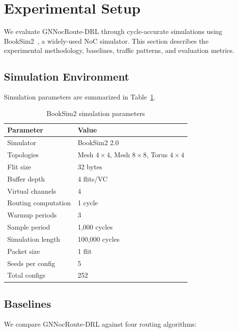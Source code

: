 \section{Experimental Setup}
\label{sec:experiments}

We evaluate GNNocRoute-DRL through cycle-accurate simulations using BookSim2~\cite{booksim}, a widely-used NoC simulator. This section describes the experimental methodology, baselines, traffic patterns, and evaluation metrics.

\subsection{Simulation Environment}

Simulation parameters are summarized in Table~\ref{tab:simparams}.

\begin{table}[h]
\centering
\caption{BookSim2 simulation parameters}
\label{tab:simparams}
\begin{tabular}{ll}
\toprule
\textbf{Parameter} & \textbf{Value} \\
\midrule
Simulator & BookSim2 2.0 \\
Topologies & Mesh $4\times4$, Mesh $8\times8$, Torus $4\times4$ \\
Flit size & 32 bytes \\
Buffer depth & 4 flits/VC \\
Virtual channels & 4 \\
Routing computation & 1 cycle \\
Warmup periods & 3 \\
Sample period & 1,000 cycles \\
Simulation length & 100,000 cycles \\
Packet size & 1 flit \\
\midrule
Seeds per config & 5 \\
Total configs & 252 \\
\bottomrule
\end{tabular}
\end{table}

\subsection{Baselines}

We compare GNNocRoute-DRL against four routing algorithms:


